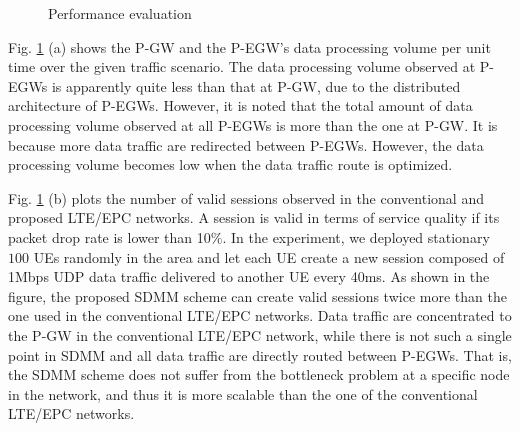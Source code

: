 \documentclass[runningheads,a4paper]{llncs}
\begin{document}
\begin{figure}[t] 
\centering 
{}
\vspace{-0.3cm}
\caption{Performance evaluation}
\label{fig:3}\vspace{-0.6cm}
\end{figure}

Fig. \ref{fig:3} (a) shows the P-GW and the P-EGW's data processing volume per unit time over the given traffic scenario. The data processing volume observed at P-EGWs is apparently quite less than that at P-GW, due to the distributed architecture of P-EGWs. However, it is noted that the total amount of data processing volume observed at all P-EGWs is more than the one at P-GW. It is because more data traffic are redirected between P-EGWs. However, the data processing volume becomes low when the data traffic route is optimized.

Fig. \ref{fig:3} (b) plots the number of valid sessions observed in the conventional and proposed LTE/EPC networks. A session is valid in terms of service quality if its packet drop rate is lower than 10$\%$. In the experiment, we deployed stationary $100$ UEs randomly in the area and let each UE create a new session composed of 1Mbps UDP data traffic delivered to another UE every 40ms. As shown in the figure, the proposed SDMM scheme can create valid sessions twice more than the one used in the conventional LTE/EPC networks. Data traffic are concentrated to the P-GW in the conventional LTE/EPC network, while there is not such a single point in SDMM and all data traffic are directly routed between P-EGWs. That is, the SDMM scheme does not suffer from the bottleneck problem at a specific node in the network, and thus it is more scalable than the one of the conventional LTE/EPC networks. 
\end{document}
